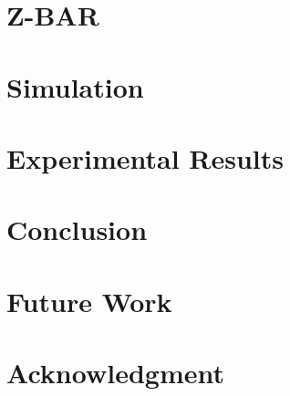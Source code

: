 \documentclass[conference]{IEEEtran}
\begin{document}



\section{Z-BAR} %

\section{Simulation}

\section{Experimental Results} %

\section{Conclusion} %

\section{Future Work} %

\section*{Acknowledgment}

\begin{thebibliography}{1}
\bibitem{}
\end{thebibliography}
\end{document}
